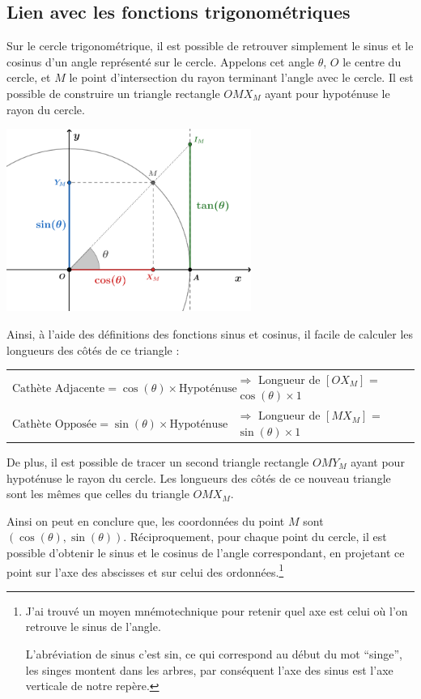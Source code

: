 \documentclass[a4paper]{article}
\begin{document}
		\subsection{Lien avec les fonctions trigonométriques}

			Sur le cercle trigonométrique, 
			il est possible de retrouver simplement le sinus et le cosinus d'un angle représenté sur le cercle. 
			Appelons cet angle $\theta$, $O$ le centre du cercle, et $M$ le point d'intersection du rayon terminant l'angle avec le cercle.
			Il est possible de construire un triangle rectangle $OMX_M$ ayant pour hypoténuse le rayon du cercle.

			\begin{center}
				\includegraphics[width=8cm]{Image/Cercle Trigo/Cercle_trigo_lien_avec_fct_trigo.png}
			\end{center}

			Ainsi, à l'aide des définitions des fonctions sinus et cosinus,
			il facile de calculer les longueurs des côtés de ce triangle :

			\begin{tabular}{ll}
				$\text{Cathète Adjacente} = \cos(\theta) \times \text{Hypoténuse}$ & $\Longrightarrow$ Longueur de $[OX_M]$ = $\cos(\theta) \times 1$\\
				$\text{Cathète Opposée} = \sin(\theta) \times \text{Hypoténuse}$   & $\Longrightarrow$ Longueur de $[MX_M]$ = $\sin(\theta) \times 1$\\
			\end{tabular}
			
			\medbreak

			De plus, il est possible de tracer un second triangle rectangle $OMY_M$ ayant pour hypoténuse le rayon du cercle.
			Les longueurs des côtés de ce nouveau triangle sont les mêmes que celles du triangle $OMX_M$.

			Ainsi on peut en conclure que,
			les coordonnées du point $M$ sont $(\cos(\theta), \sin(\theta))$.
			Réciproquement, pour chaque point du cercle,
			il est possible d'obtenir le sinus et le cosinus de l'angle correspondant,
			en projetant ce point sur l'axe des abscisses et sur celui des ordonnées.\footnote{
				J'ai trouvé un moyen mnémotechnique pour retenir quel axe est celui où l'on retrouve le sinus de l'angle.

				L'abréviation de sinus c'est sin, ce qui correspond au début du mot “singe”, 
				les singes montent dans les arbres, par conséquent l'axe des sinus est l'axe verticale de notre repère.
			}
\end{document}
